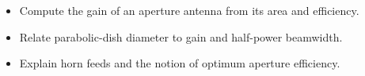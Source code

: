 \begin{objectives}
\begin{itemize}[leftmargin=1.4em,itemsep=2pt]
\item Compute the gain of an aperture antenna from its area and efficiency.
\item Relate parabolic-dish diameter to gain and half-power beamwidth.
\item Explain horn feeds and the notion of optimum aperture efficiency.
\end{itemize}
\end{objectives}
